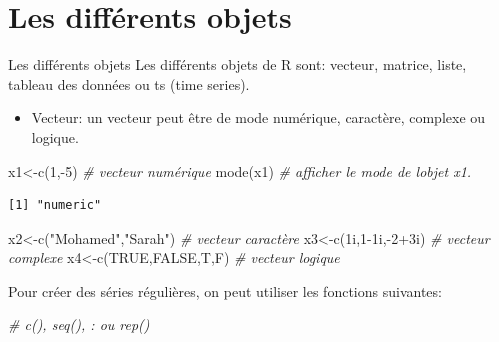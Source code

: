 \documentclass[
  8pt,
  ignorenonframetext,
]{beamer}
\newenvironment{Shaded}{\begin{snugshade}}{\end{snugshade}}
\newcommand{\CommentTok}[1]{\textcolor[rgb]{0.56,0.35,0.01}{\textit{#1}}}
\newcommand{\ConstantTok}[1]{\textcolor[rgb]{0.00,0.00,0.00}{#1}}
\newcommand{\DecValTok}[1]{\textcolor[rgb]{0.00,0.00,0.81}{#1}}
\newcommand{\FunctionTok}[1]{\textcolor[rgb]{0.00,0.00,0.00}{#1}}
\newcommand{\NormalTok}[1]{#1}
\newcommand{\OtherTok}[1]{\textcolor[rgb]{0.56,0.35,0.01}{#1}}
\newcommand{\SpecialCharTok}[1]{\textcolor[rgb]{0.00,0.00,0.00}{#1}}
\newcommand{\StringTok}[1]{\textcolor[rgb]{0.31,0.60,0.02}{#1}}
\providecommand{\tightlist}{%
  \setlength{\itemsep}{0pt}\setlength{\parskip}{0pt}}
\begin{document}
\hypertarget{les-diffuxe9rents-objets}{%
\section{Les différents objets}\label{les-diffuxe9rents-objets}}

\begin{frame}[fragile]{Les différents objets}
Les différents objets de R sont: vecteur, matrice, liste, tableau des
données ou ts (time series).

\begin{itemize}
\tightlist
\item
  Vecteur: un vecteur peut être de mode numérique, caractère, complexe
  ou logique.
\end{itemize}

\begin{Shaded}
\begin{Highlighting}[]
\NormalTok{x1}\OtherTok{\textless{}{-}}\FunctionTok{c}\NormalTok{(}\DecValTok{1}\NormalTok{,}\SpecialCharTok{{-}}\DecValTok{5}\NormalTok{)  }\CommentTok{\# vecteur numérique}
\FunctionTok{mode}\NormalTok{(x1)     }\CommentTok{\# afficher le mode de l\textquotesingle{}objet x1.}
\end{Highlighting}
\end{Shaded}

\begin{verbatim}
[1] "numeric"
\end{verbatim}

\begin{Shaded}
\begin{Highlighting}[]
\NormalTok{x2}\OtherTok{\textless{}{-}}\FunctionTok{c}\NormalTok{(}\StringTok{"Mohamed"}\NormalTok{,}\StringTok{"Sarah"}\NormalTok{)  }\CommentTok{\# vecteur caractère}
\NormalTok{x3}\OtherTok{\textless{}{-}}\FunctionTok{c}\NormalTok{(1i,}\DecValTok{1}\SpecialCharTok{{-}}\NormalTok{1i,}\SpecialCharTok{{-}}\DecValTok{2}\SpecialCharTok{+}\NormalTok{3i) }\CommentTok{\# vecteur complexe}
\NormalTok{x4}\OtherTok{\textless{}{-}}\FunctionTok{c}\NormalTok{(}\ConstantTok{TRUE}\NormalTok{,}\ConstantTok{FALSE}\NormalTok{,T,F)  }\CommentTok{\# vecteur logique}
\end{Highlighting}
\end{Shaded}

Pour créer des séries régulières, on peut utiliser les fonctions
suivantes:

\begin{Shaded}
\begin{Highlighting}[]
\CommentTok{\# c(), seq(), : ou rep()}
\end{Highlighting}
\end{Shaded}
\end{frame}
\end{document}
